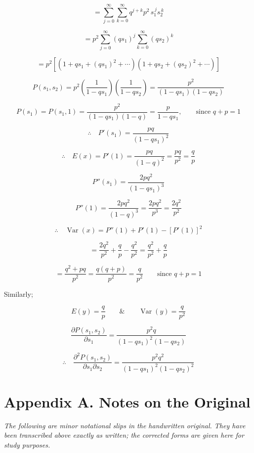 \documentclass[
]{article}
\begin{document}
\[= \sum_{j=0}^{\infty} \sum_{k=0}^{\infty} q^{j+k} p^2\, s_1^{\,j} s_2^{\,k}\]

\[= p^2 \sum_{j=0}^{\infty} (qs_1)^j \sum_{k=0}^{\infty} (qs_2)^k\]

\[= p^2 \left[ \left(1 + qs_1 + (qs_1)^2 + \cdots\right) \left(1 + qs_2 + (qs_2)^2 + \cdots\right) \right]\]

\[P(s_1, s_2) = p^2 \left( \frac{1}{1 - qs_1} \right) \left( \frac{1}{1 - qs_2} \right) = \frac{p^2}{(1 - qs_1)(1 - qs_2)}\]

\[P(s_1) = P(s_1, 1) = \frac{p^2}{(1 - qs_1)(1 - q)} = \frac{p}{1 - qs_1}, \qquad \text{since } q + p = 1\]

\[\therefore \quad P'(s_1) = \frac{pq}{(1 - qs_1)^2}\]

\[\therefore \quad E(x) = P'(1) = \frac{pq}{(1 - q)^2} = \frac{pq}{p^2} = \frac{q}{p}\]

\[P''(s_1) = \frac{2pq^2}{(1 - qs_1)^3}\]

\[P''(1) = \frac{2pq^2}{(1 - q)^3} = \frac{2pq^2}{p^3} = \frac{2q^2}{p^2}\]

\[\therefore \quad \operatorname{Var}(x) = P''(1) + P'(1) - \left[P'(1)\right]^2\]

\[= \frac{2q^2}{p^2} + \frac{q}{p} - \frac{q^2}{p^2} = \frac{q^2}{p^2} + \frac{q}{p}\]

\[= \frac{q^2 + pq}{p^2} = \frac{q(q+p)}{p^2} = \frac{q}{p^2} \qquad \text{since } q + p = 1\]

Similarly;

\[E(y) = \frac{q}{p} \qquad \& \qquad \operatorname{Var}(y) = \frac{q}{p^2}\]

\[\frac{\partial P(s_1, s_2)}{\partial s_1} = \frac{p^2 q}{(1 - qs_1)^2 (1 - qs_2)}\]

\[\therefore \quad \frac{\partial^2 P(s_1, s_2)}{\partial s_1 \partial s_2} = \frac{p^2 q^2}{(1 - qs_1)^2 (1 - qs_2)^2}\]

\section{Appendix A. Notes on the
Original}\label{appendix-a.-notes-on-the-original}

\emph{The following are minor notational slips in the handwritten
original. They have been transcribed above exactly as written; the
corrected forms are given here for study purposes.}
\end{document}
